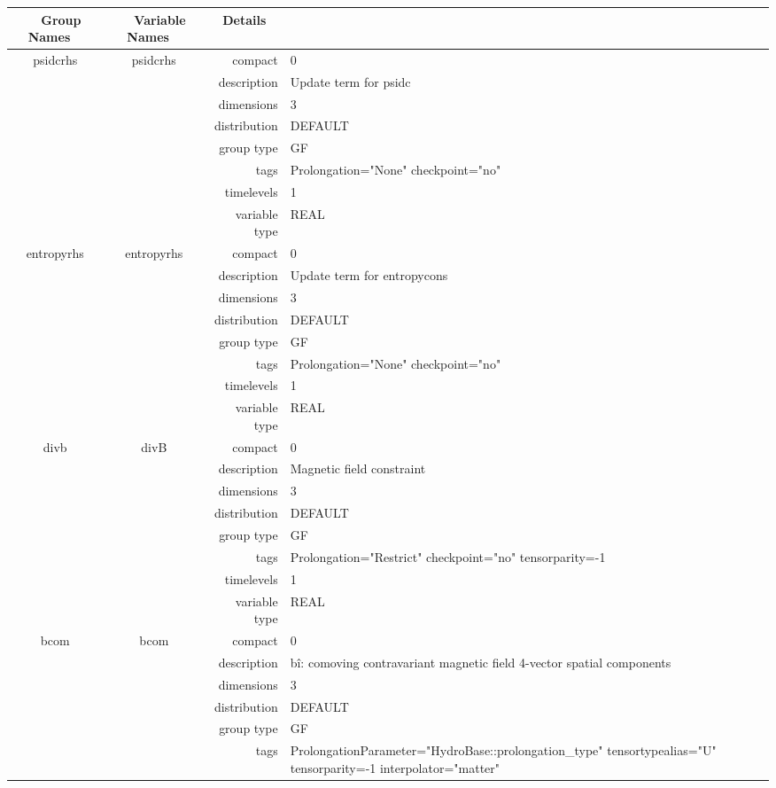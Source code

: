 \documentclass{article}
\begin{document}
\begin{tabular*}{150mm}{|c|c@{\extracolsep{\fill}}|rl|} \hline 
~ {\bf Group Names} ~ & ~ {\bf Variable Names} ~  &{\bf Details} ~ & ~ \\ 
\hline 
psidcrhs & psidcrhs & compact & 0 \\ 
 &  & description & Update term for psidc \\ 
 &  & dimensions & 3 \\ 
 &  & distribution & DEFAULT \\ 
 &  & group type & GF \\ 
 &  & tags & Prolongation="None" checkpoint="no" \\ 
 &  & timelevels & 1 \\ 
 &  & variable type & REAL \\ 
\hline 
entropyrhs & entropyrhs & compact & 0 \\ 
 &  & description & Update term for entropycons \\ 
 &  & dimensions & 3 \\ 
 &  & distribution & DEFAULT \\ 
 &  & group type & GF \\ 
 &  & tags & Prolongation="None" checkpoint="no" \\ 
 &  & timelevels & 1 \\ 
 &  & variable type & REAL \\ 
\hline 
divb & divB & compact & 0 \\ 
 &  & description & Magnetic field constraint \\ 
 &  & dimensions & 3 \\ 
 &  & distribution & DEFAULT \\ 
 &  & group type & GF \\ 
 &  & tags & Prolongation="Restrict" checkpoint="no" tensorparity=-1 \\ 
 &  & timelevels & 1 \\ 
 &  & variable type & REAL \\ 
\hline 
bcom & bcom & compact & 0 \\ 
 &  & description & b\^i: comoving contravariant magnetic field 4-vector spatial components \\ 
 &  & dimensions & 3 \\ 
 &  & distribution & DEFAULT \\ 
 &  & group type & GF \\ 
 &  & tags & ProlongationParameter="HydroBase::prolongation\_type" tensortypealias="U" tensorparity=-1 interpolator="matter" \\ 

\end{tabular*}
\end{document}
